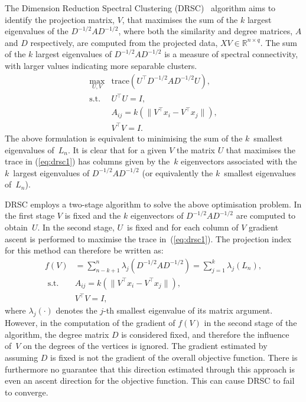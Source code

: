 \documentclass{book}
\def\R{\mathbb{R}}
\begin{document}
The Dimension Reduction Spectral Clustering (DRSC)~\cite{NiuDJ2011} algorithm
aims to identify the projection matrix, $V$, that maximises
the sum of the $k$ largest eigenvalues of the $D^{-1/2}AD^{-1/2}$,
where both the similarity and degree matrices, $A$ and $D$ respectively,
are computed from the projected data, $XV \in \R^{n \times q}$.
%
The sum of the $k$ largest eigenvalues of $D^{-1/2}AD^{-1/2}$ is a measure of
spectral connectivity, with larger values indicating more separable clusters.
%
%
\begin{eqnarray}
%
\max_{U, V} &  \mbox{trace}(U^\top D^{-1/2}AD^{-1/2}U), \label{eq:drsc1}\\
%	
\mathrm{s.t.} & U^\top U = I,\\
%
& A_{ij} = k(\|V^\top x_i - V^\top x_j \|), \label{eq:Aij}\\
%
&V^\top V = I.
%
\end{eqnarray}
%
%
The above formulation is equivalent to minimising the sum of the 
$k$~smallest eigenvalues of~$L_n$.
%
It is clear that
for a given $V$ the matrix $U$ that maximises the trace in (\ref{eq:drsc1}) has
columns given by the~$k$ eigenvectors associated with the $k$~largest
eigenvalues of $D^{-1/2}AD^{-1/2}$ (or equivalently the $k$~smallest
eigenvalues of~$L_n$).

DRSC employs a two-stage algorithm to solve the above optimisation problem.
In the first stage $V$ is fixed and the $k$ eigenvectors of $D^{-1/2}AD^{-1/2}$
are computed to obtain~$U$. In the second stage, $U$~is fixed and
for each column of $V$ gradient ascent is performed to maximise the trace
in~(\ref{eq:drsc1}). The projection index for this method can therefore be written as:
%
\begin{align*}
%
f(V) & = \sum^n_{n-k+1} \lambda_j \left( D^{-1/2}AD^{-1/2} \right) = \sum_{j=1}^k \lambda_j \left( L_n \right),\\
%
\textrm{ s.t. } & A_{ij} = k(\|V^\top x_i - V^\top x_j \|),\\
%
 & V^\top V = I,
\end{align*}
%
where $\lambda_j(\cdot)$ denotes the $j$-th smallest eigenvalue of 
its matrix argument.
%
However, in the computation of the gradient of $f(V)$ in the second stage of
the algorithm, the degree matrix $D$ is considered fixed, and therefore the
influence of~$V$ on the degrees of the vertices is ignored. The gradient
estimated by assuming $D$ is fixed is not the gradient of the overall objective
function. There is furthermore no guarantee that this direction estimated
through this approach is even an ascent direction for the objective function.
This can cause DRSC to fail to converge.
\end{document}
